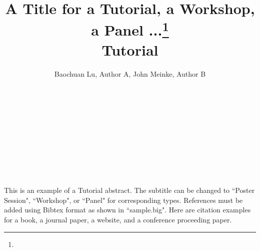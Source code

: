 \documentclass{article}
\title{A Title for a Tutorial, a Workshop, a Panel ...\footnote{\protect}
\\
\vspace{0.2in}
\large{
Tutorial
}}
\author{
Baochuan Lu\affmark[1], Author A\affmark[1], John Meinke\affmark[2], Author B\affmark[2]\\
\affaddr{\affmark[1]Computer and Information Sciences}\\
\affaddr{Southwest Baptist University}\\
\affaddr{Bolivar, MO 65613}\\
\email{\{blu,author\}@sbuniv.edu}\\
\affaddr{\affmark[2]Computer Science Department}\\
\affaddr{Another University}\\
\affaddr{Our Town, TX 00000}\\
\email{\{jmeinke,author\}@univ.edu}\\
}
\begin{document}
\maketitle

This is an example of a Tutorial abstract. The subtitle can be changed to ``Poster Session", ``Workshop", or ``Panel" for corresponding types. References must be added using Bibtex format as shown in ``sample.big". Here are citation examples for a book\cite{latexcompanion}, a journal paper\cite{einstein}, a website\cite{knuthwebsite}, and a conference proceeding paper\cite{maurer}.

\lipsum[1-2]



\end{document}
